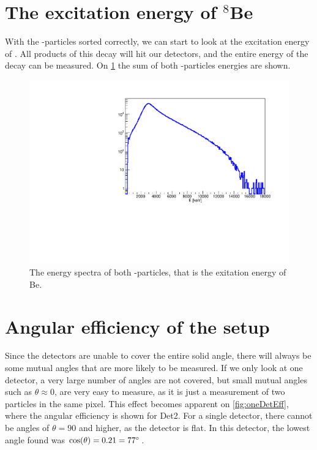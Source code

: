 \section{The excitation energy of $^8$Be}
With the \al-particles sorted correctly, we can start to look at the excitation energy of \ber. All products of this decay will hit our detectors, and the entire energy of the decay can be measured. On \cref{fig:doubleAlpha} the sum of both \al-particles energies are shown.
 



\begin{figure}[h]
	\centering
	\includegraphics[width=\linewidth]{../figures/doubleAlpha.pdf}
	\caption{The energy spectra of both \al-particles, that is the exitation energy of \isotope[8]Be.}
	\label{fig:doubleAlpha}
\end{figure}

\section{Angular efficiency of the setup}
Since the detectors are unable to cover the entire solid angle, there will always be some mutual angles that are more likely to be measured. 
If we only look at one detector, a very large number of angles are not covered, but small mutual angles such as $\theta \approx 0$, are very easy to measure, as it is just a measurement of two particles in the same pixel. 
This effect becomes apparent on \cref{fig:oneDetEff}, where the angular efficiency is shown for Det2. For a single detector, there cannot be angles of $\theta = 90$ and higher, as the detector is flat. In this detector, the lowest angle found was $\cos(\theta) = 0.21 = 77\degree$.\\

